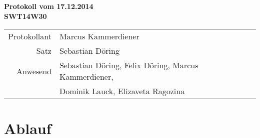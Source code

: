 \documentclass{scrartcl}
\begin{document}
\begin{center}
\LARGE \bf{Protokoll vom 17.12.2014 \\
SWT14W30}
\end{center}

\begin{tabular}{rp{10cm}}
Protokollant & Marcus Kammerdiener \\
Satz & Sebastian Döring \\
Anwesend & Sebastian Döring, Felix Döring, Marcus Kammerdiener,\\
& Dominik Lauck, Elizaveta Ragozina \\
\end{tabular}

\vspace*{3em}

\section{Ablauf}
\end{document}
